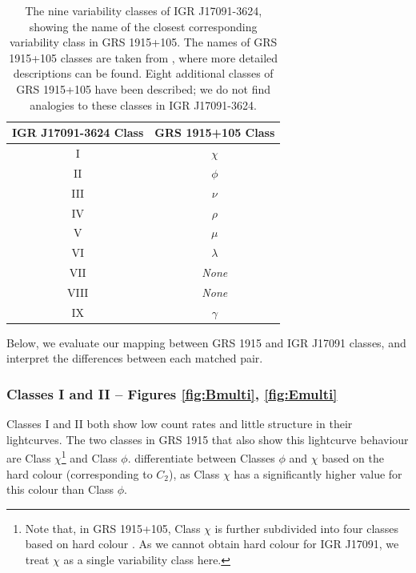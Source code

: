 \begin{table}
\centering
\caption{The nine variability classes of IGR J17091-3624, showing the name of the closest corresponding variability class in GRS 1915+105.  The names of GRS 1915+105 classes are taken from \citet{Belloni_GRS_MI}, where more detailed descriptions can be found.  Eight additional classes of GRS 1915+105 have been described; we do not find analogies to these classes in IGR J17091-3624.}
\label{tab:class_assign}
\begin{tabular}{cc} %
\hline
\hline
IGR J17091-3624 Class & GRS 1915+105 Class\\
\hline
I&$\chi$\\
II&$\phi$\\
III&$\nu$\\
IV&$\rho$\\
V&$\mu$\\
VI&$\lambda$\\
VII&\textit{None}\\
VIII&\textit{None}\\
IX&$\gamma$\\
\hline
\hline
\end{tabular}
\end{table}

\par Below, we evaluate our mapping between GRS 1915 and IGR J17091 classes, and interpret the differences between each matched pair.

\subsubsection{Classes I and II -- Figures \ref{fig:Bmulti}, \ref{fig:Emulti}}

\label{sec:DisI}

\par Classes I and II both show low count rates and little structure in their lightcurves.  The two classes in GRS 1915 that also show this lightcurve behaviour are Class $\chi$\footnote{Note that, in GRS 1915+105, Class $\chi$ is further subdivided into four classes based on hard colour \citep{Belloni_GRS_MI,Pahari_Chi}.  As we cannot obtain hard colour for IGR J17091, we treat $\chi$ as a single variability class here.} and Class $\phi$.  \citealt{Belloni_GRS_MI} differentiate between Classes $\phi$ and $\chi$ based on the hard colour (corresponding to $C_2$), as Class $\chi$ has a significantly higher value for this colour than Class $\phi$.

